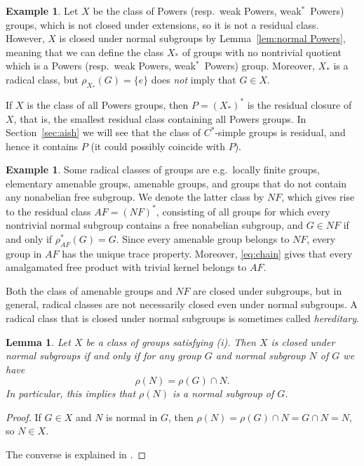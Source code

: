 \documentclass[a4paper]{amsart}
\theoremstyle{plain}
\newtheorem{lemma}[theorem]{Lemma}
\theoremstyle{definition}
\newtheorem{example}[theorem]{Example}
\theoremstyle{remark}
\numberwithin{theorem}{section}
\begin{document}
\begin{example}
Let $X$ be the class of Powers (resp.\ weak Powers, weak$^*$~Powers) groups,
which is not closed under extensions, so it is not a residual class.
However, $X$ is closed under normal subgroups by Lemma~\ref{lem:normal Powers},
meaning that we can define the class $X_*$ of groups
with no nontrivial quotient which is a Powers (resp.\ weak Powers, weak$^*$~Powers) group.
Moreover, $X_*$ is a radical class, but $\rho_{X_*}(G)=\{e\}$ does \emph{not} imply that $G\in X$.

If $X$ is the class of all Powers groups,
then $P=(X_*)^*$ is the residual closure of $X$,
that is, the smallest residual class containing all Powers groups.
In Section~\ref{sec:aish} we will see that the class of $C^*$-simple groups is residual,
and hence it contains $P$ (it could possibly coincide with $P$).
\end{example}

\begin{example}\label{ex:NF}
Some radical classes of groups are e.g.\ locally finite groups, elementary amenable groups, amenable groups,
and groups that do not contain any nonabelian free subgroup.
We denote the latter class by $NF$,
which gives rise to the residual class $AF=(NF)^*$,
consisting of all groups for which every nontrivial normal subgroup contains a free nonabelian subgroup,
and $G\in NF$ if and only if $\rho^*_{AF}(G)=G$.
Since every amenable group belongs to $NF$, every group in $AF$ has the unique trace property.
Moreover, \eqref{eq:chain} gives that every amalgamated free product with trivial kernel belongs to $AF$.
\end{example}

Both the class of amenable groups and $NF$ are closed under subgroups,
but in general, radical classes are not necessarily closed even under normal subgroups.
A radical class that is closed under normal subgroups is sometimes called \emph{hereditary}.

\begin{lemma}\label{lem:normal radical}
Let $X$ be a class of groups satisfying (i).
Then $X$ is closed under normal subgroups if and only if for any group $G$ and normal subgroup $N$ of $G$ we have
\[
\rho(N)=\rho(G)\cap N.
\]
In particular, this implies that $\rho(N)$ is a normal subgroup of $G$.
\end{lemma}

\begin{proof}
If $G\in X$ and $N$ is normal in $G$, then $\rho(N)=\rho(G)\cap N=G\cap N=N$, so $N\in X$.

The converse is explained in \cite[Lemma~1.31, Corollaries~1 and~2]{Robinson}.
\end{proof}
\end{document}
